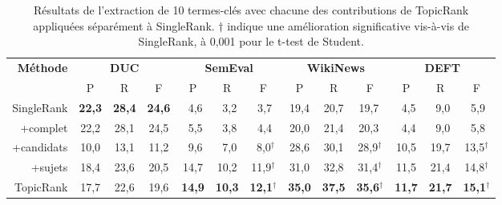     \begin{table}
      \centering
      \begin{tabular}{@{~}r@{~~}c@{~~}c@{~~}c@{~~}c@{~~}c@{~~}c@{~~}c@{~~}c@{~~}c@{~~}c@{~~}c@{~~}c@{~}}
        \toprule
        \multirow{2}{*}[-2pt]{\textbf{Méthode}} & \multicolumn{3}{c}{\textbf{DUC}} & \multicolumn{3}{c}{\textbf{SemEval}} & \multicolumn{3}{c}{\textbf{WikiNews}} & \multicolumn{3}{c}{\textbf{DEFT}}\\
        \cmidrule(r){2-4}\cmidrule(r){5-7}\cmidrule(r){8-10}\cmidrule{11-13}
        & P & R & F & P & R & F & P & R & F & P & R & F\\
        \midrule
        SingleRank & \textbf{22,3} & \textbf{28,4} & \textbf{24,6} & $~~$4,6 & $~~$3,2 & $~~$3,7$^{~}$ & 19,4 & 20,7 & 19,7$^{~}$ & $~~$4,5 & $~~$9,0 & $~~$5,9$^{~}$\\
        +complet & 22,2 & 28,1 & 24,5 & $~~$5,5 & $~~$3,8 & $~~$4,4$^{~}$ & 20,0 & 21,4 & 20,3${~}$ & $~~$4,4 & $~~$9,0 & $~~$5,8$^{~}$\\
        +candidats & 10,0 & 13,1 & 11,2 & $~~$9,6 & $~~$7,0 & $~~$8,0$^\dagger$ & 28,6 & 30,1 & 28,9$^\dagger$ & 10,5 & 19,7 & 13,5$^\dagger$\\
        +sujets & 18,4 & 23,6 & 20,5 & 14,7 & 10,2 & 11,9$^\dagger$ & 31,0 & 32,8 & 31,4$^\dagger$ & 11,5 & 21,4 & 14,8$^\dagger$\\
        TopicRank & 17,7 & 22,6 & 19,6 & \textbf{14,9} & \textbf{10,3} & \textbf{12,1}$^\dagger$ & \textbf{35,0} & \textbf{37,5} & \textbf{35,6}$^\dagger$ & \textbf{11,7} & \textbf{21,7} & \textbf{15,1}$^\dagger$\\
        \bottomrule
      \end{tabular}
      \caption{Résultats de l'extraction de 10 termes-clés avec chacune des
               contributions de TopicRank appliquées séparément à SingleRank.
               $\dagger$ indique une amélioration significative vis-à-vis de
               SingleRank, à 0,001 pour le t-test de Student.
               \label{tab:evaluation_individuelle_des_ameliorations}}
    \end{table}

